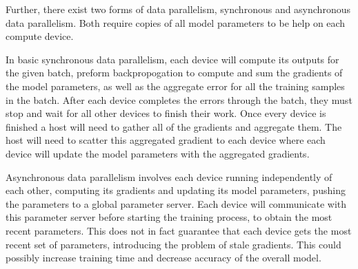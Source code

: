 \documentclass[11pt,a4paper]{article}
\begin{document}
Further, there exist two forms of data parallelism, synchronous and asynchronous data parallelism. Both require copies of all model parameters to be help on each compute device. \cite{d_parallel}

In basic synchronous data parallelism, each device will compute its outputs for the given batch, preform backpropogation to compute and sum the gradients of the model parameters, as well as the aggregate error for all the training samples in the batch. After each device completes the errors through the batch, they must stop and wait for all other devices to finish their work. Once every device is finished a host will need to gather all of the gradients and aggregate them. The host will need to scatter this aggregated gradient to each device where each device will update the model parameters with the aggregated gradients.

Asynchronous data parallelism involves each device running independently of each other, computing its gradients and updating its model parameters, pushing the parameters to a global parameter server. Each device will communicate with this parameter server before starting the training process, to obtain the most recent parameters. This does not in fact guarantee that each device gets the most recent set of parameters, introducing the problem of stale gradients. This could possibly increase training time and decrease accuracy of the overall model. 

  
  
\end{document}
